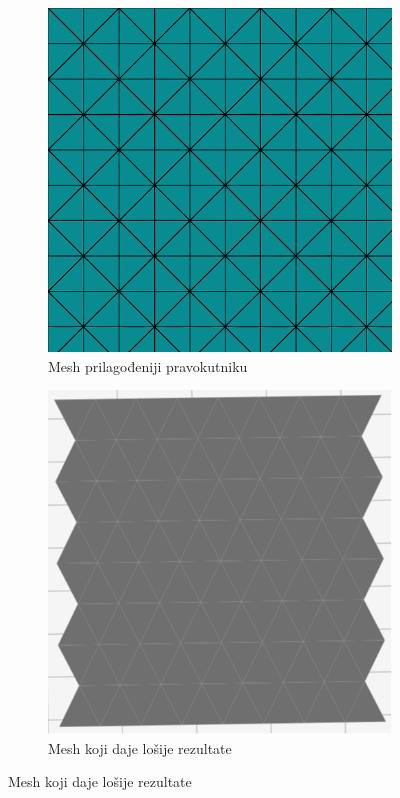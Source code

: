 \documentclass[zavrsnirad]{../fer}
\begin{document}
\begin{figure}[H]
  \centering
  \begin{subfigure}[b]{0.35\linewidth}
    \centering
    \includegraphics[width=\linewidth]{Figures/2Dmesh.png}
    \caption{Mesh prilagođeniji pravokutniku}
  \end{subfigure}
  \hfill
  \begin{subfigure}[b]{0.35\linewidth}
    \centering
    \includegraphics[width=\linewidth]{Figures/hexmesh-modified.png}
    \caption{Mesh koji daje lošije rezultate}
  \end{subfigure}
\end{figure}
\end{document}
